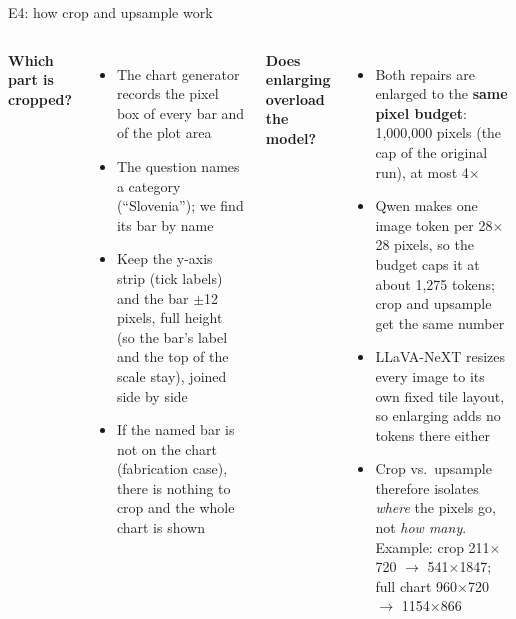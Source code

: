 \documentclass[10pt,aspectratio=169]{beamer}
\begin{document}
\begin{frame}{E4: how crop and upsample work}
\begin{columns}[T]
\footnotesize
\textbf{Which part is cropped?}
\begin{itemize}
\item The chart generator records the pixel box of every bar and of the plot area
\item The question names a category (``Slovenia''); we find its bar by name
\item Keep the y-axis strip (tick labels) and the bar $\pm$12 pixels, full height
(so the bar's label and the top of the scale stay), joined side by side
\item If the named bar is not on the chart (fabrication case), there is nothing
to crop and the whole chart is shown
\end{itemize}
\footnotesize
\textbf{Does enlarging overload the model?}
\begin{itemize}
\item Both repairs are enlarged to the \textbf{same pixel budget}: 1,000,000 pixels
(the cap of the original run), at most 4$\times$
\item Qwen makes one image token per 28$\times$28 pixels, so the budget caps it at
about 1,275 tokens; crop and upsample get the same number
\item LLaVA-NeXT resizes every image to its own fixed tile layout, so enlarging
adds no tokens there either
\item Crop vs.\ upsample therefore isolates \emph{where} the pixels go, not
\emph{how many}. Example: crop 211$\times$720 $\to$ 541$\times$1847; full chart
960$\times$720 $\to$ 1154$\times$866
\end{itemize}
\end{columns}
\end{frame}
\end{document}
